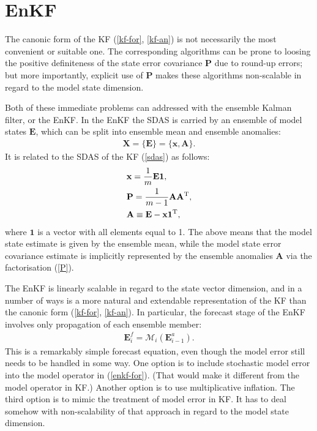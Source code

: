 \documentclass[11pt]{report}
\newcommand{\mb} {\mathbf}
\newcommand{\T}{^{\tiny \mathrm T}}
\begin{document}
\section{EnKF}

The canonic form of the KF (\ref{kf-for}, \ref{kf-an}) is not necessarily the most convenient or suitable one.
The corresponding algorithms can be prone to loosing the positive definiteness of the state error covariance $\mb P$ due to round-up errors; but more importantly, explicit use of $\mb P$ makes these algorithms non-scalable in regard to the model state dimension.

Both of these immediate problems can addressed with the ensemble Kalman filter, or the EnKF.
In the EnKF the SDAS is carried by an ensemble of model states $\mb E$, which can be split into ensemble mean and ensemble anomalies:
\begin{align}
  \label{sdas-enkf}
  \mb X = \{\mb E\} = \{\mb x, \mb A\}.
\end{align}
It is related to the SDAS of the KF (\ref{sdas}) as follows:
\begin{subequations}
  \label{E}
  \begin{align}
    \label{x}
    &\mb x = \frac{1}{m} \mb E \mb 1,\\
    \label{P}
    &\mb P = \frac{1}{m - 1} \mb A \mb A\T,\\
    \label{A}
    &\mb A \equiv \mb E - \mb x \mb 1\T,
  \end{align}
\end{subequations}
where $\mb 1$ is a vector with all elements equal to 1.
The above means that the model state estimate is given by the ensemble mean, while the model state error covariance estimate is implicitly represented by the ensemble anomalies $\mb A$ via the factorisation (\ref{P}).

The EnKF is linearly scalable in regard to the state vector dimension, and in a number of ways is a more natural and extendable representation of the KF than the canonic form (\ref{kf-for}, \ref{kf-an}).
In particular, the forecast stage of the EnKF involves only propagation of each ensemble member:
\begin{align}
  \label{enkf-for}
  \mb E_i^f = \mathcal M_i(\mb E_{i-1}^a).
\end{align}
This is a remarkably simple forecast equation, even though the model error still needs to be handled in some way.
One option is to include stochastic model error into the model operator in (\ref{enkf-for}).
(That would make it different from the model operator in KF.)
Another option is to use multiplicative inflation.
The third option is to mimic the treatment of model error in KF.
It has to deal somehow with non-scalability of that approach in regard to the model state dimension.
\end{document}
